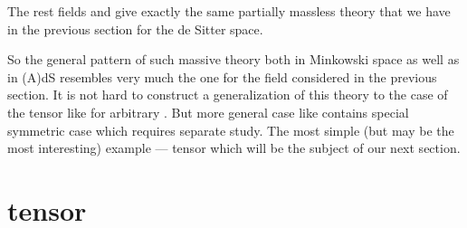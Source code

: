 \documentclass[a4paper,12pt]{article}
\begin{document}
The rest fields \myHighlight{$\Phi_{\mu\nu,\alpha}$}\coordHE{} and \coordHE{} give exactly
the same partially massless theory that we have in the previous section
for the de Sitter space.

So the general pattern of such massive theory both in Minkowski space
as well as in (A)dS resembles very much the one for the field
\myHighlight{$\Phi_{\mu\nu,\alpha}$}\coordHE{} considered in the previous section. It is not
hard to construct a generalization of this theory to the case of
the tensor like \coordHE{} for arbitrary \coordHE{}.
But more general case like \coordHE{}
contains special symmetric case \coordHE{} which requires separate study.
The most simple (but may be the most interesting) example --- tensor
\coordHE{} which will be the subject of our next
section.

\section{\coordHE{} tensor}
\end{document}
